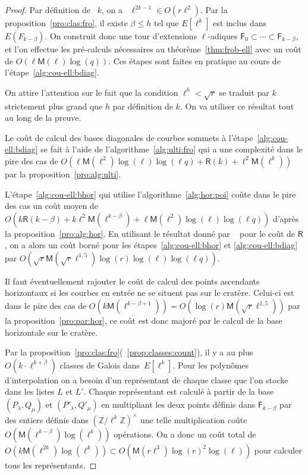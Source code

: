 \documentclass[10pt,a4paper]{book}
\theoremstyle{plain}
\theoremstyle{definition}
\theoremstyle{definition}
\theoremstyle{definition}
\theoremstyle{definition}
\theoremstyle{definition}
\theoremstyle{remark}
\theoremstyle{remark}
\theoremstyle{definition}
\begin{document}
\begin{proof}
Par définition de ~$k$, on a ~$\ell^{2k-1} \in O(r\ell^2)$.
  Par la proposition~\ref{pro:clas:fro}, il existe $\beta \leqslant h$ tel que
  $E[\ell^k]$ est inclus dans $E(F_{k-\beta})$. On construit donc une
  tour d'extensions $\ell$-adiques $\mathsf{F}_0\subset\cdots\subset 
  \mathsf{F}_{k-\beta}$, et l'on effectue les pré-calculs nécessaires au 
  théorème~\ref{thm:frob-ell} avec un coût de 
  $O(\ell\mathsf{M}(\ell)\log(q))$. Ces étapes sont faites en pratique au cours
  de l'étape~\ref{alg:cou-ell:bdiag}.
  
  On attire l'attention sur le fait que la condition $\ell^h<\sqrt{r}$ se traduit par 
  $k$ strictement plus grand que $h$ par définition de $k$.
  On va utiliser ce résultat tout au long de la preuve. 
 
  Le coût de calcul des bases diagonales de courbes sommets à 
  l'étape~\ref{alg:cou-ell:bdiag} se fait à l'aide de 
  l'algorithme~\ref{alg:ulti:fro} qui a une complexité dans le pire des cas
  de 
  $O(\ell\mathsf{M}(\ell^2)\log(\ell)\log(\ell q)+\mathsf{R}(k) +  \ell^2\mathsf{M}(\ell^{k}))$ 
  par la proposition~\ref{pro:alg:ulti}. %

  L'étape~\ref{alg:cou-ell:bhor} qui utilise 
  l'algorithme~\ref{alg:hor:poi} coûte dans le pire des cas un coût moyen de
  $O(k\mathsf{R}(k-\beta) + k\ell^2\mathsf{M}(\ell^{k-\beta}) + \ell\mathsf{M}(\ell^2)\log(\ell)\log(\ell q))$ d'après la 
  proposition~\ref{pro:alg:hor}.
  En utilisant le  résultat  donné par ~\cite[Chapter~14.5]{vzGJG03} pour le 
  coût de $\mathsf{R}$, on a alors un coût borné pour les 
  étapes~\ref{alg:cou-ell:bhor} et \ref{alg:cou-ell:bdiag} par 
  $O(\sqrt{r}\mathsf{M}(\sqrt{r}\ell^{1,5})\log(r)\log(\ell)\log(\ell q))$.
  
  Il faut éventuellement rajouter le coût de calcul des points ascendants 
  horizontaux si les courbes en entrée ne se situent pas sur le cratère. 
  Celui-ci est dans le pire des cas de
  $O(k\mathsf{M}(\ell^{k-\beta+1})) = O(\log(r) \mathsf{M}(\sqrt{r} \ell^{1,5}) )$ par la proposition~\ref{pro:par:hor}, ce 
  coût est donc majoré par le calcul de la base horizontale sur le cratère.

  Par la proposition~\ref{pro:clas:fro}(~\ref{prop:classes:count}), il y a au 
  plus~$O(k \cdot \ell^{k+\beta})$ classes de Galois dans~$E[\ell^k]$. 
  Pour les polynômes d'interpolation on a besoin d'un représentant de chaque 
  classe que l'on stocke dans les listes $L$ et $L'$. Chaque représentant est
  calculé à partir de la base $(P_{\lambda},Q_{\mu})$ et $(P'_{\lambda},
  Q'_{\mu})$ en multipliant les deux points définis dans $\mathsf{F}_{k-\beta}$
  par des entiers définis dans $\left( \mathbb{Z}/\ell^{k}\mathbb{Z}
  \right)^{\times}$ une telle multiplication coûte $O(\mathsf{M}(\ell^{k-\beta}
  )\log(\ell^k))$ opérations. On a donc un coût total de 
  $O(k\mathsf{M}(\ell^{2k})\log(\ell^k)) \subset O(\mathsf{M}(r\ell^{3})\log(r)^2 \log(\ell))$
  pour calculer tous les représentants.
  

\end{proof}
\end{document}
